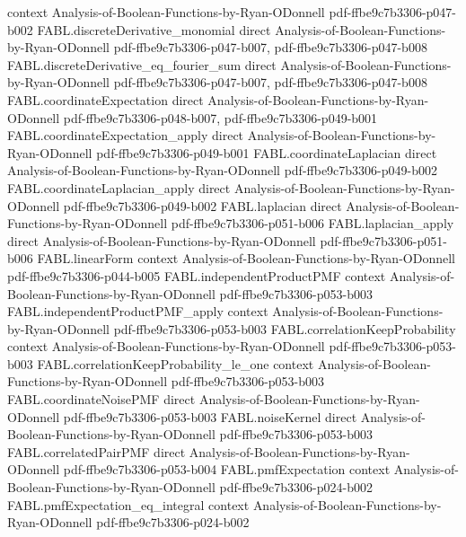 \begin{theorem}
  {context}
  {Analysis-of-Boolean-Functions-by-Ryan-ODonnell}
  {pdf-ffbe9c7b3306-p047-b002}
\proofstep
  {FABL.discreteDerivative_monomial}
  {direct}
  {Analysis-of-Boolean-Functions-by-Ryan-ODonnell}
  {pdf-ffbe9c7b3306-p047-b007,
    pdf-ffbe9c7b3306-p047-b008}
\proofstep
  {FABL.discreteDerivative_eq_fourier_sum}
  {direct}
  {Analysis-of-Boolean-Functions-by-Ryan-ODonnell}
  {pdf-ffbe9c7b3306-p047-b007,
    pdf-ffbe9c7b3306-p047-b008}
\proofstep
  {FABL.coordinateExpectation}
  {direct}
  {Analysis-of-Boolean-Functions-by-Ryan-ODonnell}
  {pdf-ffbe9c7b3306-p048-b007,
    pdf-ffbe9c7b3306-p049-b001}
\proofstep
  {FABL.coordinateExpectation_apply}
  {direct}
  {Analysis-of-Boolean-Functions-by-Ryan-ODonnell}
  {pdf-ffbe9c7b3306-p049-b001}
\proofstep
  {FABL.coordinateLaplacian}
  {direct}
  {Analysis-of-Boolean-Functions-by-Ryan-ODonnell}
  {pdf-ffbe9c7b3306-p049-b002}
\proofstep
  {FABL.coordinateLaplacian_apply}
  {direct}
  {Analysis-of-Boolean-Functions-by-Ryan-ODonnell}
  {pdf-ffbe9c7b3306-p049-b002}
\proofstep
  {FABL.laplacian}
  {direct}
  {Analysis-of-Boolean-Functions-by-Ryan-ODonnell}
  {pdf-ffbe9c7b3306-p051-b006}
\proofstep
  {FABL.laplacian_apply}
  {direct}
  {Analysis-of-Boolean-Functions-by-Ryan-ODonnell}
  {pdf-ffbe9c7b3306-p051-b006}
\proofstep
  {FABL.linearForm}
  {context}
  {Analysis-of-Boolean-Functions-by-Ryan-ODonnell}
  {pdf-ffbe9c7b3306-p044-b005}
\proofstep
  {FABL.independentProductPMF}
  {context}
  {Analysis-of-Boolean-Functions-by-Ryan-ODonnell}
  {pdf-ffbe9c7b3306-p053-b003}
\proofstep
  {FABL.independentProductPMF_apply}
  {context}
  {Analysis-of-Boolean-Functions-by-Ryan-ODonnell}
  {pdf-ffbe9c7b3306-p053-b003}
\proofstep
  {FABL.correlationKeepProbability}
  {context}
  {Analysis-of-Boolean-Functions-by-Ryan-ODonnell}
  {pdf-ffbe9c7b3306-p053-b003}
\proofstep
  {FABL.correlationKeepProbability_le_one}
  {context}
  {Analysis-of-Boolean-Functions-by-Ryan-ODonnell}
  {pdf-ffbe9c7b3306-p053-b003}
\proofstep
  {FABL.coordinateNoisePMF}
  {direct}
  {Analysis-of-Boolean-Functions-by-Ryan-ODonnell}
  {pdf-ffbe9c7b3306-p053-b003}
\proofstep
  {FABL.noiseKernel}
  {direct}
  {Analysis-of-Boolean-Functions-by-Ryan-ODonnell}
  {pdf-ffbe9c7b3306-p053-b003}
\proofstep
  {FABL.correlatedPairPMF}
  {direct}
  {Analysis-of-Boolean-Functions-by-Ryan-ODonnell}
  {pdf-ffbe9c7b3306-p053-b004}
\proofstep
  {FABL.pmfExpectation}
  {context}
  {Analysis-of-Boolean-Functions-by-Ryan-ODonnell}
  {pdf-ffbe9c7b3306-p024-b002}
\proofstep
  {FABL.pmfExpectation_eq_integral}
  {context}
  {Analysis-of-Boolean-Functions-by-Ryan-ODonnell}
  {pdf-ffbe9c7b3306-p024-b002}

\end{theorem}
